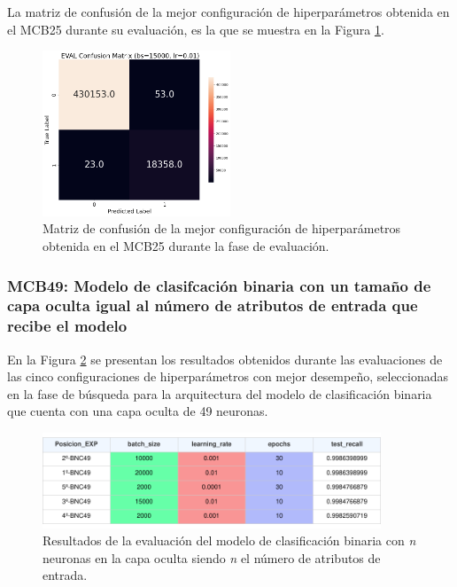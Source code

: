 La matriz de confusión de la mejor configuración de hiperparámetros obtenida en el MCB25 durante su evaluación, es la que se muestra en la Figura \ref{fig:MC_EVAL_MCB25}.

\begin{figure}[H]
    \centering
    \includegraphics[width=0.5\textwidth]{./img/evaluacion/matrices_confusion/MC_EVAL_MCB25.png}
    \caption{Matriz de confusión de la mejor configuración de hiperparámetros obtenida en el MCB25 durante la fase de evaluación.}
    \label{fig:MC_EVAL_MCB25}
\end{figure}


\subsubsection{MCB49: Modelo de clasifcación binaria con un tamaño de capa oculta igual al número de atributos de entrada que recibe el modelo}
En la Figura \ref{fig:EVALMCB49} se presentan los resultados obtenidos durante las evaluaciones de las cinco configuraciones de hiperparámetros con mejor desempeño, seleccionadas en la fase de búsqueda para la arquitectura del modelo de clasificación binaria que cuenta con una capa oculta de 49 neuronas.

\begin{figure}[H]
    \centering
    \includegraphics[width=0.9\textwidth]{./img/evaluacion/resultados/EVALMCB49.pdf}
    \caption{Resultados de la evaluación del modelo de clasificación binaria con \textit{n} neuronas en la capa oculta siendo \textit{n} el número de atributos de entrada.}
    \label{fig:EVALMCB49}
\end{figure}

